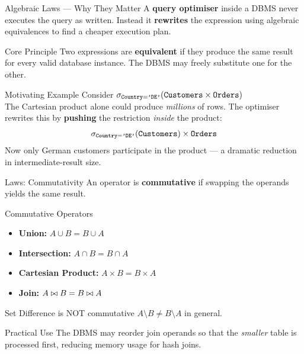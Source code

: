 \begin{frame}{Algebraic Laws --- Why They Matter}
  A \textbf{query optimiser} inside a DBMS never executes the query as written.
  Instead it \textbf{rewrites} the expression using algebraic equivalences to
  find a cheaper execution plan.

  \begin{block}{Core Principle}
    Two expressions are \textbf{equivalent} if they produce the same result
    for every valid database instance.  The DBMS may freely substitute one for
    the other.
  \end{block}

  \begin{examples}{Motivating Example}
    Consider
    $\sigma_{\texttt{Country}=\texttt{'DE'}}(\texttt{Customers} \times \texttt{Orders})$\\[4pt]
    The Cartesian product alone could produce \emph{millions} of rows.  The
    optimiser rewrites this by \textbf{pushing} the restriction
    \emph{inside} the product:
    \[
      \sigma_{\texttt{Country}=\texttt{'DE'}}(\texttt{Customers}) \times \texttt{Orders}
    \]
    Now only German customers participate in the product --- a dramatic
    reduction in intermediate-result size.
  \end{examples}
\end{frame}

\begin{frame}{Laws: Commutativity}
  An operator is \textbf{commutative} if swapping the operands yields the
  same result.

  \begin{block}{Commutative Operators}
    \begin{itemize}
      \item \textbf{Union:}             $A \cup B = B \cup A$
      \item \textbf{Intersection:}      $A \cap B = B \cap A$
      \item \textbf{Cartesian Product:} $A \times B = B \times A$
      \item \textbf{Join:}              $A \bowtie B = B \bowtie A$
    \end{itemize}
  \end{block}

  \begin{alertblock}{Set Difference is NOT commutative}
    $A \setminus B \neq B \setminus A$ in general.
  \end{alertblock}

  \begin{block}{Practical Use}
    The DBMS may reorder join operands so that the \emph{smaller} table is
    processed first, reducing memory usage for hash joins.
  \end{block}
\end{frame}

